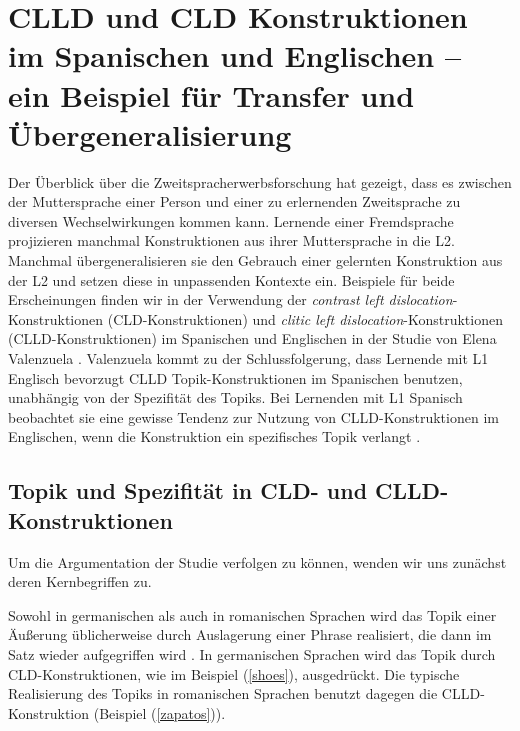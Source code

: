 \section{CLLD und CLD Konstruktionen im Spanischen und Englischen -- ein Beispiel für Transfer und Übergeneralisierung}


Der Überblick über die Zweitspracherwerbsforschung hat gezeigt, dass es zwischen der Muttersprache einer Person und einer zu erlernenden Zweitsprache zu diversen Wechselwirkungen kommen kann.
Lernende einer Fremdsprache projizieren manchmal Konstruktionen aus ihrer Muttersprache in die L2.
Manchmal übergeneralisieren sie den Gebrauch einer gelernten Konstruktion aus der L2 und setzen diese in unpassenden Kontexte ein.
Beispiele für beide Erscheinungen finden wir in der Verwendung der \textit{contrast left dislocation}-Konstruktionen (CLD-Konstruktionen) und \textit{clitic left dislocation}-Konstruktionen (CLLD-Konstruktionen) im Spanischen und Englischen in der Studie von Elena Valenzuela \cite{Valenzuela05}.
Valenzuela kommt zu der Schlussfolgerung, dass Lernende mit L1 Englisch bevorzugt CLLD Topik-Konstruktionen im Spanischen benutzen, unabhängig von der Spezifität des Topiks.
Bei Lernenden mit L1 Spanisch beobachtet sie eine gewisse Tendenz zur Nutzung von CLLD-Konstruktionen im Englischen, wenn die Konstruktion ein spezifisches Topik verlangt \cite[vgl.][S.10]{Valenzuela05}.




\subsection{Topik und Spezifität in CLD- und CLLD-Konstruktionen}
Um die Argumentation der Studie \cite{Valenzuela05} verfolgen zu können, wenden wir uns zunächst deren Kernbegriffen zu.

Sowohl in germanischen als auch in romanischen Sprachen wird das Topik einer Äußerung üblicherweise durch Auslagerung einer Phrase realisiert, die dann im Satz wieder aufgegriffen wird \cite[S.1]{Valenzuela05}.
In germanischen Sprachen wird das Topik durch CLD-Konstruktionen, wie im Beispiel (\ref{shoes}), ausgedrückt.
Die typische Realisierung des Topiks in romanischen Sprachen benutzt dagegen die CLLD-Konstruktion (Beispiel (\ref{zapatos})).

